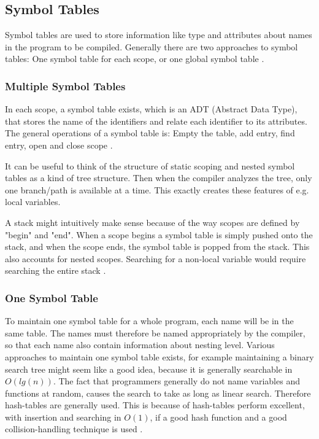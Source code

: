 \subsection{Symbol Tables}
Symbol tables are used to store information like type and attributes about names in the program to be compiled. Generally there are two approaches to symbol tables: One symbol table for each scope, or one global symbol table \citep{sebesta}. 
\subsubsection{Multiple Symbol Tables}
In each scope, a symbol table exists, which is an ADT (Abstract Data Type), that stores the name of the identifiers and relate each identifier to its attributes. The general operations of a symbol table is: Empty the table, add entry, find entry, open and close scope \citep{sebesta}. 

It can be useful to think of the structure of static scoping and nested symbol tables as a kind of tree structure. Then when the compiler analyzes the tree, only one branch/path is available at a time. This exactly creates these features of e.g. local variables.

A stack might intuitively make sense because of the way scopes are defined by "begin" and "end". When a scope begins a symbol table is simply pushed onto the stack, and when the scope ends, the symbol table is popped from the stack. This also accounts for nested scopes. Searching for a non-local variable would require searching the entire stack \citep{sebesta}. 

\subsubsection{One Symbol Table}
To maintain one symbol table for a whole program, each name will be in the same table. The names must therefore be named appropriately by the compiler, so that each name also contain information about nesting level. Various approaches to maintain one symbol table exists, for example maintaining a binary search tree might seem like a good idea, because it is generally searchable in $O(lg(n))$. The fact that programmers generally do not name variables and functions at random, causes the search to take as long as linear search. Therefore hash-tables are generally used. This is because of hash-tables perform excellent, with insertion and searching in $O(1)$, if a good hash function and a good collision-handling technique is used \citep{sebesta}.